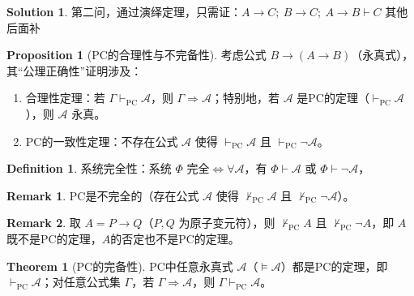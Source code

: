\documentclass[oneside]{book}
\theoremstyle{definition}
\newtheorem{proposition}{Proposition}[section]
\newtheorem{definition}{Definition}[section]
\newtheorem{theorem}{Theorem}[section]
\newtheorem{remark}{Remark}[section]
\newtheorem*{sol}{Solution}
\begin{document}
\begin{sol}
第二问，通过演绎定理，只需证：\( A \to C;\ B \to C;\ A \to B \vdash C \)
其他后面补
\end{sol}


\begin{proposition}[PC的合理性与不完备性]
	考虑公式 \( B \to (A \to B) \)（永真式），其“公理正确性”证明涉及：
	\begin{enumerate}
		\item 合理性定理：若 \( \Gamma \vdash_{\text{PC}} \mathcal{A} \)，则 \( \Gamma \Rightarrow \mathcal{A} \)；特别地，若 \( \mathcal{A} \) 是PC的定理（\( \vdash_{\text{PC}} \mathcal{A} \)），则 \( \mathcal{A} \) 永真。
		\item PC的一致性定理：不存在公式 \( \mathcal{A} \) 使得 \( \vdash_{\text{PC}} \mathcal{A} \) 且 \( \vdash_{\text{PC}} \neg \mathcal{A} \)。
	\end{enumerate}
\end{proposition}
\begin{definition}
	系统完全性：系统 \(\Phi\) 完全\(\iff\)\( \forall\mathcal{A} \)，有 \( \Phi \vdash \mathcal{A} \) 或 \( \Phi \vdash \neg \mathcal{A} \)，
\end{definition}
\begin{remark}
	PC是不完全的（存在公式 \( \mathcal{A} \) 使得 \( \nvdash_{\text{PC}} \mathcal{A} \) 且 \( \nvdash_{\text{PC}} \neg \mathcal{A} \)）。
\end{remark}
\begin{remark}
	取 \( A = P \to Q \)（\( P, Q \) 为原子变元符），则 \( \nvdash_{\text{PC}} A \) 且 \( \nvdash_{\text{PC}} \neg A \)，即 \( A \) 既不是PC的定理，\(A\)的否定也不是PC的定理。
\end{remark}




\begin{theorem}[PC的完备性]
	PC中任意永真式 \( \mathcal{A} \)（\( \vDash \mathcal{A} \)）都是PC的定理，即 \( \vdash_{\text{PC}} \mathcal{A} \)；对任意公式集 \( \Gamma \)，若 \( \Gamma \Rightarrow \mathcal{A} \)，则 \( \Gamma \vdash_{\text{PC}} \mathcal{A} \)。
\end{theorem}
\end{document}
